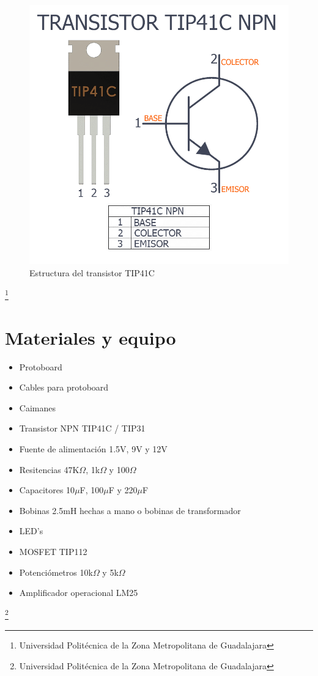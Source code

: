 \documentclass[10pt,a4paper]{article}
\begin{document}
\begin{figure}[hbtp]
\centering
\includegraphics[scale=0.2]{Pictures/TIP41C.png}
\caption{Estructura del transistor TIP41C}
\end{figure}
\footnote{Universidad Politécnica de la Zona Metropolitana de Guadalajara}

\newpage
\section{Materiales y equipo}

\begin{itemize}
\item Protoboard
\item Cables para protoboard
\item Caimanes
\item Transistor NPN TIP41C / TIP31
\item Fuente de alimentación 1.5V, 9V  y 12V
\item Resitencias 47K$\Omega$, 1k$\Omega$ y 100$\Omega$
\item Capacitores 10$\mu$F, 100$\mu$F y 220$\mu$F
\item Bobinas 2.5mH hechas a mano o bobinas de transformador
\item LED's 
\item MOSFET TIP112
\item Potenciómetros 10k$\Omega$ y 5k$\Omega$
\item Amplificador operacional LM25
\end{itemize}
\footnote{Universidad Politécnica de la Zona Metropolitana de Guadalajara}
\end{document}
